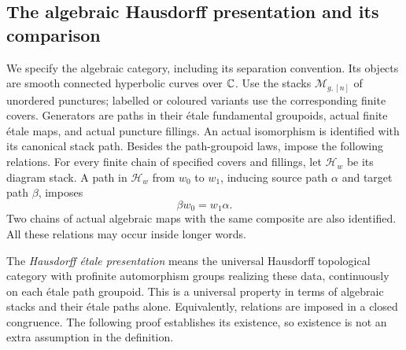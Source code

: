 \subsection{The algebraic Hausdorff presentation and its comparison}

We specify the algebraic category, including its separation convention.
Its objects are smooth connected hyperbolic curves over $\mathbb C$.
Use the stacks $\mathcal M_{g,[n]}$ of unordered punctures;
labelled or coloured variants use the corresponding finite covers.
Generators are paths in their \'etale fundamental groupoids,
actual finite \'etale maps, and actual puncture fillings.
An actual isomorphism is identified with its canonical stack path.
Besides the path-groupoid laws, impose the following relations.
For every finite chain of specified covers and fillings, let
$\mathcal H_w$ be its diagram stack. A path in $\mathcal H_w$
from $w_0$ to $w_1$, inducing source path $\alpha$ and target
path $\beta$, imposes
\[
                       \beta w_0=w_1\alpha.
\]
Two chains of actual algebraic maps with the same composite
are also identified. All these relations may occur inside
longer words.

The \emph{Hausdorff \'etale presentation} means the universal
Hausdorff topological category with profinite automorphism groups
realizing these data, continuously on each \'etale path groupoid.
This is a universal property in terms of algebraic stacks and
their \'etale paths alone. Equivalently, relations are imposed
in a closed congruence. The following proof establishes its
existence, so existence is not an extra assumption in the definition.

